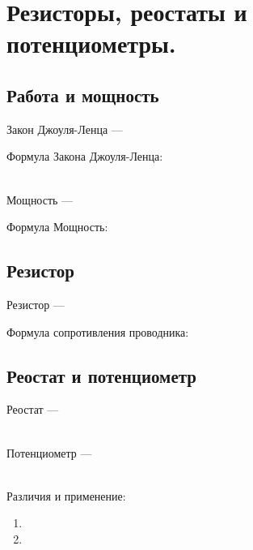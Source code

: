 \section{Резисторы, реостаты и потенциометры.}


\subsection{Работа и мощность}

Закон Джоуля-Ленца --- \hrulefill

\hrulefill

\hrulefill

Формула Закона Джоуля-Ленца:

\\
Мощность --- \hrulefill

\hrulefill

\hrulefill

Формула Мощность:


\subsection{Резистор}

Резистор --- \hrulefill

\hrulefill

\hrulefill

Формула сопротивления проводника:

 
\subsection{Реостат и потенциометр}

Реостат --- \hrulefill%

\hrulefill
\\
Потенциометр --- \hrulefill %

\hrulefill
\\
Различия и применение:
\begin{enumerate}
\item  \hrulefill

\hrulefill
\item \hrulefill 

\hrulefill
\end{enumerate}

